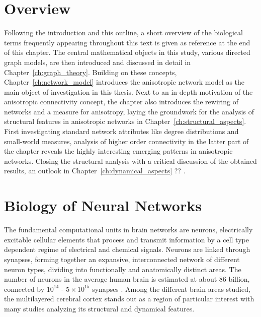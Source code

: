 
\section{Overview}\label{sec:all_overview}

Following the introduction and this outline, a short overview of the
biological terms frequently appearing throughout this text is given as
reference at the end of this chapter. The central mathematical objects
in this study, various directed graph models, are then introduced and
discussed in detail in Chapter~\ref{ch:graph_theory}. Building on
these concepts, Chapter~\ref{ch:network_model} introduces the
anisotropic network model as the main object of investigation in this
thesis. Next to an in-depth motivation of the anisotropic connectivity
concept, the chapter also introduces the rewiring of networks and a
measure for anisotropy, laying the groundwork for the analysis of
structural features in anisotropic networks in
Chapter~\ref{ch:structural_aspects}. First investigating standard
network attributes like degree distributions and small-world measures,
analysis of higher order connectivity in the latter part of the
chapter reveals the highly interesting emerging patterns in
anisotropic networks. Closing the structural analysis with a critical
discussion of the obtained results, an outlook in
Chapter~\ref{ch:dynamical_aspects} ?? . 



\section{Biology of Neural Networks}\label{sec:Biology} 



The fundamental computational units in brain networks are
neurons, electrically excitable cellular elements that
process and transmit information by a cell type dependent regime of
electrical and chemical signals. Neurons are linked through
synapses, forming together an expansive, interconnected
network of different neuron types, dividing into functionally and
anatomically distinct areas. The number of neurons in the average
human brain is estimated at about 86 billion, connected by
$10^{14}$ - $5\times10^{15}$ synapses \parencite{Herculano2009,
  Drachman2005}. Among the different brain areas studied, the
multilayered cerebral cortex stands out as a region of
particular interest with many studies analyzing its structural and
dynamical features.

